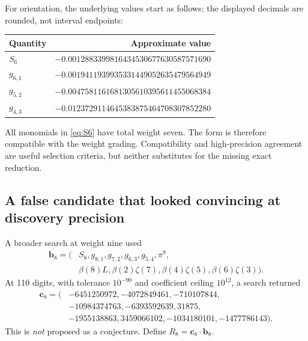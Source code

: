 \documentclass[11pt,letterpaper]{article}
\numberwithin{equation}{section}
\theoremstyle{definition}
\begin{document}
For orientation, the underlying values start as follows; the displayed
decimals are rounded, not interval endpoints:
\begin{center}
\begin{tabular}{lr}
\toprule
Quantity&Approximate value\\
\midrule
$S_6$&$-0.0012883399816434530677630587571690$\\
$g_{6,1}$&$-0.0019411939935331449052635479564949$\\
$g_{5,2}$&$-0.0047581161681305610395611455068384$\\
$g_{4,3}$&$-0.0123729114645383875464708307852280$\\
\bottomrule
\end{tabular}
\end{center}
All monomials in \eqref{eq:S6} have total weight seven. The form is
therefore compatible with the weight grading. Compatibility and
high-precision agreement are useful selection criteria, but neither
substitutes for the missing exact reduction.

\subsection{A false candidate that looked convincing at discovery precision}
A broader search at weight nine used
\begin{equation}
\begin{split}
 \mathbf b_8=(&S_8,g_{8,1},g_{7,2},g_{6,3},g_{5,4},\pi^9,\\
            &\beta(8)L,\beta(2)\zeta(7),\beta(4)\zeta(5),
                         \beta(6)\zeta(3)).
\end{split}
\label{eq:S8basket}
\end{equation}
At 110 digits, with tolerance $10^{-90}$ and coefficient ceiling
$10^{12}$, a search returned
\begin{equation}
\begin{split}
 \mathbf c_8=(&-6451250972,-4072849461,-710107844,\\
             &-10984374763,-6393592639,31875,\\
             &-1955138863,3459066102,-1034180101,-1477786143).
\end{split}
\label{eq:S8vector}
\end{equation}
This is \emph{not} proposed as a conjecture. Define
$R_8=\mathbf c_8\cdot\mathbf b_8$.
\end{document}
